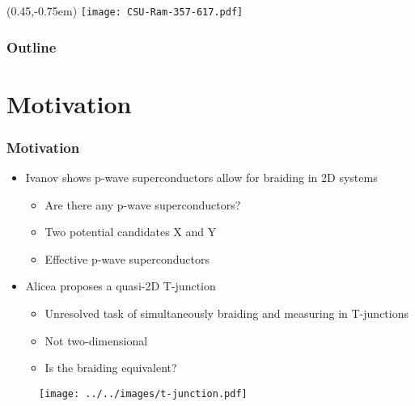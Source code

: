 \documentclass[xcolor=dvipsnames,9pt]{beamer}
\title{\TT}
\subtitle{}
\author{Aidan Winblad}
\institute{Colorado State University}
\date{\today}
\newcommand{\MO}{Motivation}
\begin{document}
  \begin{frame}
    \begin{textblock*}{100mm}(0.45\textwidth,-0.75em)
      \texttt{[image: CSU-Ram-357-617.pdf]}
    \end{textblock*}
  \titlepage
  \end{frame}

  \begin{frame}
  \frametitle{Outline}
  \tableofcontents
  \end{frame}

  \section{\MO}
  \begin{frame}
    \frametitle{\MO}

    \begin{multicols}{2}

    \begin{itemize}
      \item Ivanov shows p-wave superconductors allow for braiding in 2D systems 
        \begin{itemize}
          \item Are there any p-wave superconductors?
          \item Two potential candidates X and Y
          \item Effective p-wave superconductors
        \end{itemize}
      \item Alicea proposes a quasi-2D T-junction
        \begin{itemize}
          \item Unresolved task of simultaneously braiding and measuring in T-junctions
          \item Not two-dimensional
          \item Is the braiding equivalent?
        \end{itemize}
    \end{itemize}

    \begin{figure}
      \texttt{[image: ../../images/t-junction.pdf]}
    \end{figure}
    \end{multicols}
  \end{frame}
\end{document}
